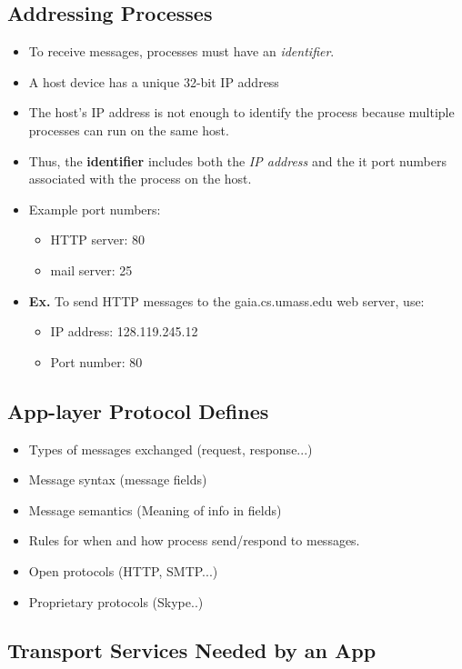 \documentclass{article}
\begin{document}
\subsection{Addressing Processes}

\begin{itemize}
\item To receive messages, processes must have an {\it identifier}.
\item A host device has a unique 32-bit IP address
\item The host's IP address is not enough to identify the process because multiple processes can run on the same host.
\item Thus, the {\bf identifier} includes both the {\it IP address} and the {it port numbers} associated with the process on the host.
\item Example port numbers:
\begin{itemize}
\item HTTP server: 80
\item mail server: 25
\end{itemize}
\item {\bf Ex.} To send HTTP messages to the gaia.cs.umass.edu web server, use:
\begin{itemize}
\item IP address: 128.119.245.12
\item Port number: 80
\end{itemize}
\end{itemize}

\clearpage

\subsection{App-layer Protocol Defines}

\begin{itemize}
\item Types of messages exchanged (request, response...)
\item Message syntax (message fields)
\item Message semantics (Meaning of info in fields)
\item Rules for when and how process send/respond to messages.
\item Open protocols (HTTP, SMTP...)
\item Proprietary protocols (Skype..)
\end{itemize}

\subsection{Transport Services Needed by an App}
\end{document}
